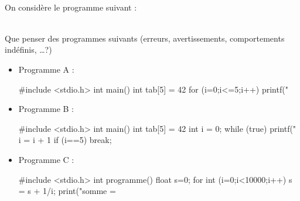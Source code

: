 \documentclass[11pt,a4paper]{article}
\begin{document}
\begin{Exercise}[title={Analyser un programme}] \\
On considère le programme suivant :
\end{Exercise}

\begin{Exercise}[title={Programmes à commenter}]\\
Que penser des programmes suivants (erreurs, avertissements, comportements indéfinis, \dots ?)
\begin{itemize}
	\item[\textbullet] Programme A :
	\begin{langageC}
		#include <stdio.h>
		int main()
		int tab[5] = {42}
		for (i=0;i<=5;i++){
			printf("%
		}
	\end{langageC}
	\item[\textbullet] Programme B :
	\begin{langageC}
		#include <stdio.h>
		int main(){
		int tab[5] = {42}
		int i = 0;
		while (true)
			{
				printf("%
				i = i + 1
				if (i==5) {break;}
			}
		}
	\end{langageC}
	\item[\textbullet] Programme C :
	\begin{langageC}
		#include <stdio.h>
		int programme() {
			float s=0;
			for int (i=0;i<10000;i++)
			{
				s = s + 1/i;
			}
			print("somme =%
		}
	\end{langageC}
\end{itemize}
\end{Exercise}
\end{document}
